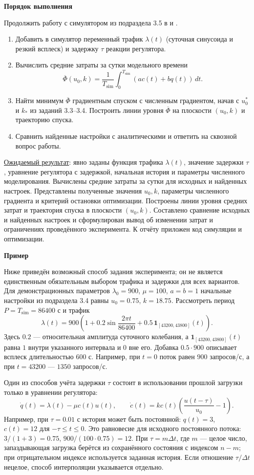 \documentclass[12pt,a4paper]{article}
\newcommand{\taskhead}[1]{\par\textbf{#1}\par}
\begin{document}
\taskhead{Порядок выполнения}
Продолжить работу с симулятором из подраздела 3.5 в  и .
\begin{enumerate}
\item Добавить в симулятор переменный трафик $\lambda(t)$
(суточная синусоида и резкий всплеск) и задержку $\tau$ реакции регулятора.
\item Вычислить средние затраты за сутки модельного времени
\[
\overline\Phi(u_0,k)=\frac1{T_{\mathrm{sim}}}
\int_0^{T_{\mathrm{sim}}}(ac(t)+bq(t))\,dt.
\]
\item Найти минимум $\overline\Phi$ градиентным спуском с численным градиентом,
начав с $u_0^*$ и $k_*$ из заданий 3.3--3.4. Построить линии уровня
$\overline\Phi$ на плоскости $(u_0,k)$ и траекторию спуска.
\item Сравнить найденные настройки с аналитическими и ответить на сквозной вопрос работы.
\end{enumerate}
\underline{Ожидаемый результат}: явно заданы функция трафика $\lambda(t)$,
значение задержки $\tau$, уравнение регулятора с задержкой,
начальная история и параметры численного моделирования.
Вычислены средние затраты за сутки для исходных и найденных настроек.
Представлены полученные значения $u_0,k$, параметры численного градиента
и критерий остановки оптимизации. Построены линии уровня средних затрат
и траектория спуска в плоскости $(u_0,k)$.
Составлено сравнение исходных и найденных настроек и сформулирован вывод
об изменении затрат и ограничениях проведённого эксперимента.
К отчёту приложен код симуляции и оптимизации.

\taskhead{Пример}
Ниже приведён возможный способ задания эксперимента; он не является
единственным обязательным выбором трафика и задержки для всех вариантов.
Для демонстрационных параметров $\lambda_0=900$, $\mu=100$, $a=b=1$
начальные настройки из подраздела 3.4 равны $u_0=0.75$, $k=18.75$.
Рассмотреть период $P=T_{\mathrm{sim}}=86400$ с и трафик
\[
\lambda(t)=900\left(1+0.2\sin\frac{2\pi t}{86400}
+0.5\,\mathbf1_{[43200,43800]}(t)\right).
\]
Здесь $0.2$ --- относительная амплитуда суточного колебания,
а $\mathbf1_{[43200,43800]}(t)$ равна $1$ внутри указанного интервала
и $0$ вне его. Добавка $0.5\cdot900$ описывает всплеск длительностью $600$ с.
Например, при $t=0$ поток равен $900$ запросов/с, а при $t=43200$ --- $1350$ запросов/с.

Один из способов учёта задержки $\tau$ состоит в использовании
прошлой загрузки только в уравнении регулятора:
\[
\dot q(t)=\lambda(t)-\mu c(t)u(t),\qquad
\dot c(t)=kc(t)\left(\frac{u(t-\tau)}{u_0}-1\right).
\]
Например, при $\tau=0.01$ с история может быть постоянной:
$q(t)=3$, $c(t)=12$ для $-\tau\leq t\leq0$.
Это равновесие для исходного постоянного потока: $3/(1+3)=0.75$,
$900/(100\cdot0.75)=12$.
При $\tau=m\Delta t$, где $m$ --- целое число, запаздывающая загрузка
берётся из сохранённого состояния с индексом $n-m$;
при отрицательном индексе используется заданная история.
Если отношение $\tau/\Delta t$ нецелое, способ интерполяции указывается отдельно.
\end{document}
